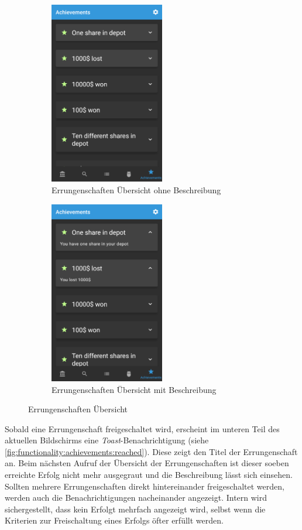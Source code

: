 \documentclass[a4paper]{article}
\begin{document}
\begin{figure}[H]
    \begin{subfigure}{.5\textwidth}
        \centering
        \includegraphics[height=8cm,keepaspectratio]{./images/achievements_list.png}  
        \caption{Errungenschaften Übersicht ohne Beschreibung}
        \label{fig:functionality:achievements:overview:closed}
    \end{subfigure}
    \begin{subfigure}{.5\textwidth}
        \centering
        \includegraphics[height=8cm,keepaspectratio]{./images/achievements_list_open.png}  
        \caption{Errungenschaften Übersicht mit Beschreibung}
        \label{fig:functionality:achievements:overview:open}
    \end{subfigure}
    \caption{Errungenschaften Übersicht}
    \label{fig:functionality:achievements:overview}
\end{figure}

Sobald eine Errungenschaft freigeschaltet wird, erscheint im unteren Teil des aktuellen Bildschirms eine \textit{Toast}-Benachrichtigung \autocite{android_toasts} (siehe \autoref{fig:functionality:achievements:reached}).
Diese zeigt den Titel der Errungenschaft an.
Beim nächsten Aufruf der Übersicht der Errungenschaften ist dieser soeben erreichte Erfolg nicht mehr ausgegraut und die Beschreibung lässt sich einsehen.
Sollten mehrere Errungenschaften direkt hintereinander freigeschaltet werden, werden auch die Benachrichtigungen nacheinander angezeigt.
Intern wird sichergestellt, dass kein Erfolgt mehrfach angezeigt wird, selbst wenn die Kriterien zur Freischaltung eines Erfolgs öfter erfüllt werden.
\end{document}

